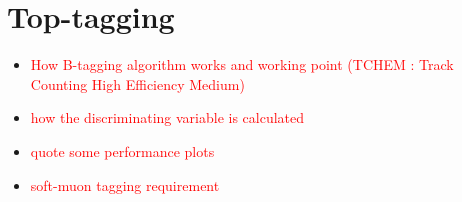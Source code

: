 \section{ Top-tagging }
\begin{itemize}
\item \textcolor{red}{How B-tagging algorithm works and working point
      (TCHEM : Track Counting High Efficiency Medium)}
\item \textcolor{red}{how the discriminating variable is calculated }
\item \textcolor{red}{quote some performance plots }
\item \textcolor{red}{soft-muon tagging requirement }
\end{itemize}
